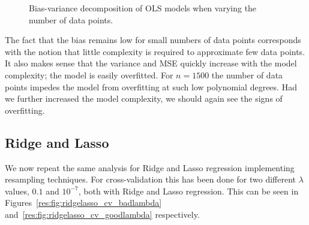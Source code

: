 \documentclass[twocolumn,english,notitlepage]{article}
\begin{document}
\begin{figure}[ht]
                \caption{Bias-variance decomposition of OLS models when varying the number of data points.}
                \label{res:fig:bs_bias_var_data_points}
            \end{figure}
            The fact that the bias remains low for small numbers of data points corresponds with the notion that little complexity is required to approximate few data points. It also makes sense that the variance and MSE quickly increase with the model complexity; the model is easily overfitted. For $n=1500$ the number of data points impedes the model from overfitting at such low polynomial degrees. Had we further increased the model complexity, we should again see the signs of overfitting. 

    

    \subsection{Ridge and Lasso}
        We now repeat the same analysis for Ridge and Lasso regression implementing resampling techniques. For cross-validation this has been done for two different $\lambda$ values, $0.1$ and $10^{-7}$, both with Ridge and Lasso regression. This can be seen in Figures~\ref{res:fig:ridgelasso_cv_badlambda} and~\ref{res:fig:ridgelasso_cv_goodlambda} respectively.
\end{document}
